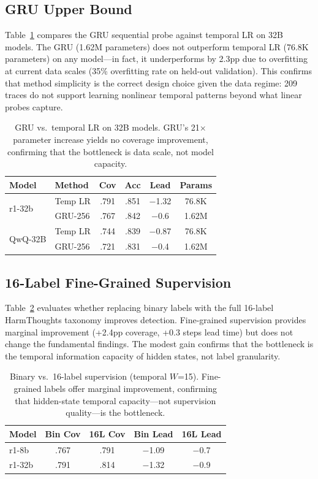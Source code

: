 \documentclass[11pt,a4paper]{article}
\begin{document}
\subsection{GRU Upper Bound}

Table~\ref{tab:gru} compares the GRU sequential probe against temporal LR on 32B models.
The GRU (1.62M parameters) does not outperform temporal LR (76.8K parameters) on any model---in fact, it underperforms by 2.3pp due to overfitting at current data scales (35\% overfitting rate on held-out validation).
This confirms that method simplicity is the correct design choice given the data regime: 209 traces do not support learning nonlinear temporal patterns beyond what linear probes capture.

\begin{table}[t]
\centering
\small
\begin{tabular}{llcccc}
\toprule
\textbf{Model} & \textbf{Method} & \textbf{Cov} & \textbf{Acc} & \textbf{Lead} & \textbf{Params} \\
\midrule
\multirow{2}{*}{r1-32b} & Temp LR & .791 & .851 & $-$1.32 & 76.8K \\
& GRU-256 & .767 & .842 & $-$0.6 & 1.62M \\
\midrule
\multirow{2}{*}{QwQ-32B} & Temp LR & .744 & .839 & $-$0.87 & 76.8K \\
& GRU-256 & .721 & .831 & $-$0.4 & 1.62M \\
\bottomrule
\end{tabular}
\caption{GRU vs.\ temporal LR on 32B models.  GRU's 21$\times$ parameter increase yields no coverage improvement, confirming that the bottleneck is data scale, not model capacity.}
\label{tab:gru}
\end{table}

\subsection{16-Label Fine-Grained Supervision}

Table~\ref{tab:16label} evaluates whether replacing binary labels with the full 16-label HarmThoughts taxonomy improves detection.
Fine-grained supervision provides marginal improvement (+2.4pp coverage, +0.3 steps lead time) but does not change the fundamental findings.
The modest gain confirms that the bottleneck is the temporal information capacity of hidden states, not label granularity.

\begin{table}[t]
\centering
\small
\begin{tabular}{lcccc}
\toprule
\textbf{Model} & \textbf{Bin Cov} & \textbf{16L Cov} & \textbf{Bin Lead} & \textbf{16L Lead} \\
\midrule
r1-8b & .767 & .791 & $-$1.09 & $-$0.7 \\
r1-32b & .791 & .814 & $-$1.32 & $-$0.9 \\
\bottomrule
\end{tabular}
\caption{Binary vs.\ 16-label supervision (temporal $W$=15).  Fine-grained labels offer marginal improvement, confirming that hidden-state temporal capacity---not supervision quality---is the bottleneck.}
\label{tab:16label}
\end{table}
\end{document}
